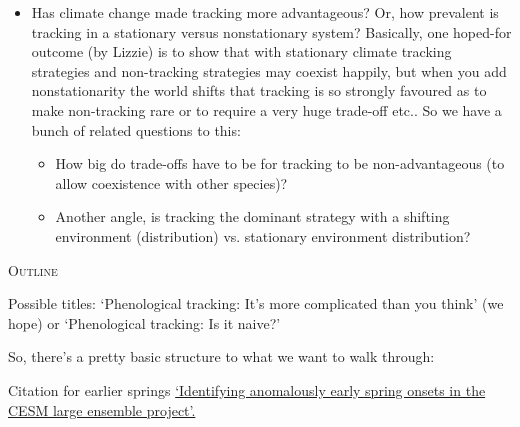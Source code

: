 \documentclass[11pt,letterpaper]{article}
\renewcommand{\section}[1]{%
\bigskip
\begin{center}
\begin{Large}
\normalfont\scshape #1
\medskip
\end{Large}
\end{center}}
\begin{document}
\begin{itemize}
\item Has climate change made tracking more advantageous? Or, how prevalent is tracking in a stationary versus nonstationary system? Basically, one hoped-for outcome (by Lizzie) is to show that with stationary climate tracking strategies and non-tracking strategies may coexist happily, but when you add nonstationarity the world shifts that tracking is so strongly favoured as to make non-tracking rare or to require a very huge trade-off etc.. So we have a bunch of related questions to this:
\begin{itemize}
\item How big do trade-offs have to be for tracking to be non-advantageous (to allow coexistence with other species)?
\item Another angle, is tracking the dominant strategy with a shifting environment (distribution) vs. stationary environment distribution?
\end{itemize}
\end{itemize}

\section{Outline}

\noindent Possible titles: `Phenological tracking: It's more complicated than you think' (we hope) or `Phenological tracking: Is it naive?'

So, there's a pretty basic structure to what we want to walk through:



\noindent Citation for earlier springs \href{https://link.springer.com/article/10.1007/s00382-016-3313-2}{`Identifying anomalously early spring onsets in the CESM large ensemble project'.}
\end{document}
